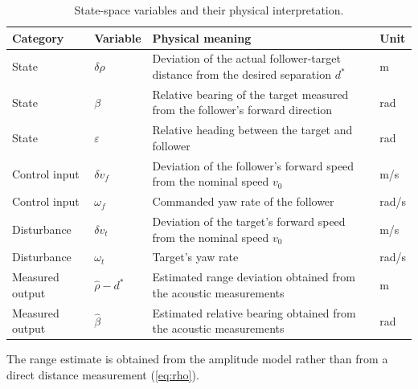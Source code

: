 \begin{table}[!t]
\centering
\caption{State-space variables and their physical interpretation.}
\label{tab:model_variables}
\small
\renewcommand{\arraystretch}{1.15}
\begin{tabular}{p{} p{} p{} p{}}
\hline
\textbf{Category} & \textbf{Variable} & \textbf{Physical meaning} & \textbf{Unit}\\
\hline
State
& $\delta\rho$
& Deviation of the actual follower-target distance  from the desired separation $d^\ast$
& m\\

State
& $\beta$
& Relative bearing of the target measured from the follower's forward direction
& rad\\

State
& $\varepsilon$
& Relative heading between the target and follower
& rad\\

Control input
& $\delta v_f$
& Deviation of the follower's forward speed from the nominal speed $v_0$
& m/s\\

Control input
& $\omega_f$
& Commanded yaw rate of the follower
& rad/s\\

Disturbance
& $\delta v_t$
& Deviation of the target's forward speed from the nominal speed $v_0$
& m/s\\

Disturbance
& $\omega_t$
& Target's yaw rate
& rad/s\\

Measured output
& $\hat{\rho}-d^\ast$
& Estimated range deviation obtained from the acoustic measurements
& m\\

Measured output
& $\hat{\beta}$
& Estimated relative bearing obtained from the acoustic measurements
& rad\\
\hline
\end{tabular}
\end{table}

The range estimate is obtained from the amplitude model rather than from a direct distance measurement (\autoref{eq:rho}). 

